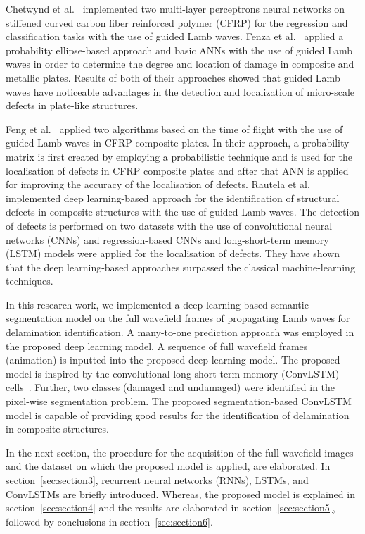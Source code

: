 \documentclass{IOS-Book-Article}
\begin{document}
Chetwynd et al.~\cite{Chetwynd2008} implemented two multi-layer perceptrons 
neural networks on stiffened curved carbon fiber reinforced polymer 
(CFRP) for the regression and classification tasks with the use of guided Lamb 
waves.
Fenza et al.~\cite{Fenza2015} applied a probability ellipse-based approach and 
basic ANNs with the use of guided Lamb waves in order to  determine the degree 
and location of damage in composite and metallic plates. Results of both of 
their approaches showed that guided Lamb waves have noticeable advantages in 
the detection and localization of micro-scale defects in plate-like 
structures. 

Feng et al.~\cite{Feng2019} applied two algorithms based on the time of flight 
with the use of guided Lamb waves in CFRP composite plates.  
In their approach, a probability matrix is first created by employing a 
probabilistic technique and is used for the localisation of defects in CFRP 
composite plates and after that ANN is applied for improving the accuracy 
of the localisation of defects.
Rautela et al.~\cite{Rautela2021} implemented deep learning-based approach for 
the identification of structural defects in composite structures with the use 
of guided Lamb waves. 
The detection of defects is performed on two datasets with the use of 
convolutional neural networks (CNNs) and regression-based CNNs and 
long-short-term memory (LSTM) models were applied for the localisation of 
defects. 
They have shown that the deep learning-based approaches surpassed the classical 
machine-learning techniques.

In this research work, we implemented a deep learning-based semantic 
segmentation model on the full wavefield frames of propagating Lamb waves for 
delamination identification.
A many-to-one prediction approach was employed in the proposed deep learning 
model.
A sequence of full wavefield frames (animation) is inputted into the proposed 
deep learning model.
The proposed model is inspired by the convolutional
long short-term memory (ConvLSTM) cells~\cite{Shi2018}.
Further, two classes (damaged and undamaged) were identified in the pixel-wise 
segmentation problem.
The proposed segmentation-based ConvLSTM model is capable of providing good 
results for the identification of delamination in composite structures.

In the next section, the procedure for the acquisition of the full wavefield 
images and the dataset on which the proposed model is applied, are 
elaborated.
In section~\ref{sec:section3}, recurrent neural networks (RNNs), LSTMs, and 
ConvLSTMs are briefly introduced.
Whereas, the proposed model is explained in section~\ref{sec:section4} and the 
results are elaborated in section~\ref{sec:section5}, followed by conclusions 
in section~\ref{sec:section6}.
\end{document}
